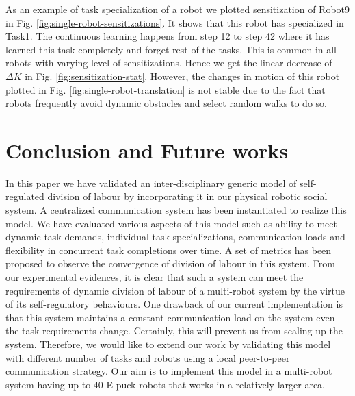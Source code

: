 \documentclass{llncs}
\begin{document}
As an example of task specialization of a robot we plotted sensitization of Robot9 in Fig. \ref{fig:single-robot-sensitizations}. It shows that this robot has specialized in Task1. The continuous learning happens from step 12 to step 42 where it has learned this task completely and forget rest of the tasks. This is common in all robots with varying level of sensitizations. Hence we get the linear decrease of $\Delta K$ in Fig. \ref{fig:sensitization-stat}. However, the changes in motion of this robot plotted in Fig. \ref{fig:single-robot-translation} is not stable due to the fact that robots frequently avoid dynamic obstacles and select random walks to do so.
\section{Conclusion and Future works}
\label{sec:conc}
In this paper we have validated an inter-disciplinary generic model of self-regulated division of labour by incorporating it in our physical robotic social system. A centralized communication system has been instantiated to realize this model. We have evaluated various aspects of this model such as ability to meet dynamic task demands, individual task specializations, communication loads and flexibility in concurrent task completions over time. A set of metrics has been proposed to observe the convergence of division of labour in this system. From our experimental evidences, it is clear that such a system can meet the requirements of dynamic division of labour of a multi-robot system by the virtue of its self-regulatory behaviours. One drawback of our current implementation is that this system maintains a constant communication load on the system even the task requirements change. Certainly, this will prevent us from scaling up the system. Therefore, we would like to extend our work by validating this model with different number of tasks and robots using a local peer-to-peer communication strategy. Our aim is to implement this model in a multi-robot system having up to 40 E-puck robots that works in a relatively larger area.
\end{document}

